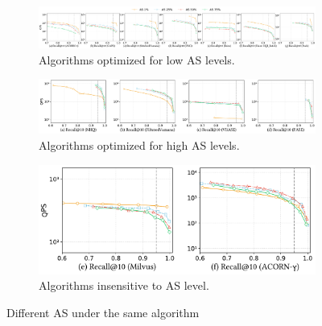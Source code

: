 \documentclass[sigconf, nonacm]{acmart}
\begin{document}
	
	\begin{figure}
		\centering
		
		\begin{subfigure}{\textwidth}
			\centering
			\setlength{\abovecaptionskip}{0.05cm}
			\setlength{\belowcaptionskip}{0.05cm}
			\includegraphics[width=\textwidth]{figures/exp/exp_5_2_1.pdf}
			\caption{Algorithms optimized for low AS levels.}
			\label{fig:exp_5_2_1}
		\end{subfigure}
		
		\vfill %
		
		\begin{subfigure}{0.66\textwidth} %
			\centering
			\setlength{\abovecaptionskip}{0.05cm}
			\setlength{\belowcaptionskip}{0.05cm}
			\includegraphics[width=\textwidth]{figures/exp/exp_5_2_2.pdf}
			\caption{Algorithms optimized for high AS levels.}
			\label{fig:exp_5_2_2}
		\end{subfigure}
		\hfill %
		\begin{subfigure}{0.33\textwidth} %
			\centering
			\setlength{\abovecaptionskip}{0.05cm}
			\setlength{\belowcaptionskip}{0.05cm}
			\includegraphics[width=\textwidth]{figures/exp/exp_5_2_3.pdf}
			\caption{Algorithms insensitive to AS level.}
			\label{fig:exp_5_2_3}
		\end{subfigure}
		
		   \setlength{\abovecaptionskip}{0cm}
		    \setlength{\belowcaptionskip}{-0.5cm}
		\caption{Different AS under the same algorithm}
		\label{fig:exp_5_2_combined}
	\end{figure}
	
\end{document}
